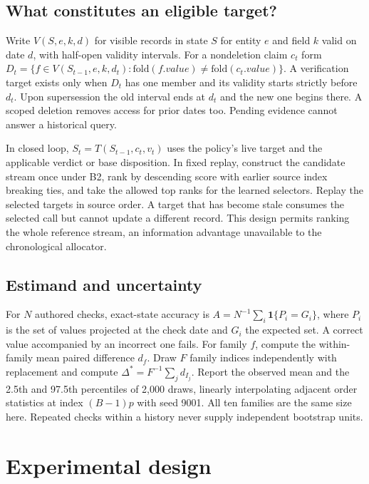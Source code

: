 \documentclass[
  11pt,
]{article}
\begin{document}
\subsection{What constitutes an eligible
target?}\label{what-constitutes-an-eligible-target}

Write \(V(S,e,k,d)\) for visible records in state \(S\) for entity \(e\)
and field \(k\) valid on date \(d\), with half-open validity intervals.
For a nondeletion claim \(c_t\) form
\(D_t=\{f\in V(S_{t-1},e,k,d_t):\mathrm{fold}(f.value)\ne\mathrm{fold}(c_t.value)\}\).
A verification target exists only when \(D_t\) has one member and its
validity starts strictly before \(d_t\). Upon supersession the old
interval ends at \(d_t\) and the new one begins there. A scoped deletion
removes access for prior dates too. Pending evidence cannot answer a
historical query.

In closed loop, \(S_t=T(S_{t-1},c_t,v_t)\) uses the policy's live target
and the applicable verdict or base disposition. In fixed replay,
construct the candidate stream once under B2, rank by descending score
with earlier source index breaking ties, and take the allowed top ranks
for the learned selectors. Replay the selected targets in source order.
A target that has become stale consumes the selected call but cannot
update a different record. This design permits ranking the whole
reference stream, an information advantage unavailable to the
chronological allocator.

\subsection{Estimand and uncertainty}\label{estimand-and-uncertainty}

For \(N\) authored checks, exact-state accuracy is
\(A=N^{-1}\sum_i \mathbf{1}\{P_i=G_i\}\), where \(P_i\) is the set of
values projected at the check date and \(G_i\) the expected set. A
correct value accompanied by an incorrect one fails. For family \(f\),
compute the within-family mean paired difference \(d_f\). Draw \(F\)
family indices independently with replacement and compute
\(\Delta^*=F^{-1}\sum_j d_{I_j}\). Report the observed mean and the
2.5th and 97.5th percentiles of 2,000 draws, linearly interpolating
adjacent order statistics at index \((B-1)p\) with seed 9001. All ten
families are the same size here. Repeated checks within a history never
supply independent bootstrap units.

\section{Experimental design}\label{experimental-design}
\end{document}

